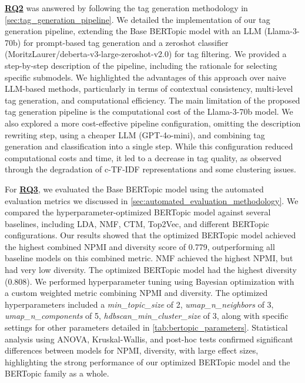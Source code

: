 \hyperref[rq2]{\textbf{RQ2}} was answered by following the tag generation methodology in \cref{sec:tag_generation_pipeline}. We detailed the implementation of our tag generation pipeline, extending the Base BERTopic model with an LLM (Llama-3-70b) for prompt-based tag generation and a zeroshot classifier (MoritzLaurer/deberta-v3-large-zeroshot-v2.0) for tag filtering. We provided a step-by-step description of the pipeline, including the rationale for selecting specific submodels. We highlighted the advantages of this approach over naive LLM-based methods, particularly in terms of contextual consistency, multi-level tag generation, and computational efficiency. The main limitation of the proposed tag generation pipeline is the computational cost of the Llama-3-70b model. We also explored a more cost-effective pipeline configuration, omitting the description rewriting step, using a cheaper LLM (GPT-4o-mini), and combining tag generation and classification into a single step. While this configuration reduced computational costs and time, it led to a decrease in tag quality, as observed through the degradation of c-TF-IDF representations and some clustering issues.

For \hyperref[rq3]{\textbf{RQ3}}, we evaluated the Base BERTopic model using the automated evaluation metrics we discussed in \cref{sec:automated_evaluation_methodology}. We compared the hyperparameter-optimized BERTopic model against several baselines, including LDA, NMF, CTM, Top2Vec, and different BERTopic configurations. Our results showed that the optimized BERTopic model achieved the highest combined NPMI and diversity score of 0.779, outperforming all baseline models on this combined metric. NMF achieved the highest NPMI, but had very low diversity. The optimized BERTopic model had the highest diversity (0.808). We performed hyperparameter tuning using Bayesian optimization with a custom weighted metric combining NPMI and diversity. The optimized hyperparameters included a \textit{min\_topic\_size} of 2, \textit{umap\_n\_neighbors} of 3, \textit{umap\_n\_components} of 5, \textit{hdbscan\_min\_cluster\_size} of 3, along with specific settings for other parameters detailed in \cref{tab:bertopic_parameters}. Statistical analysis using ANOVA, Kruskal-Wallis, and post-hoc tests confirmed significant differences between models for NPMI, diversity, with large effect sizes, highlighting the strong performance of our optimized BERTopic model and the BERTopic family as a whole.

